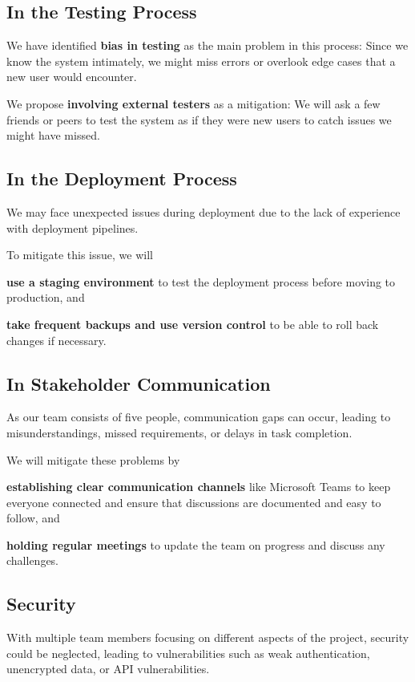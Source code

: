 \documentclass[a4paper,journal]{IEEEtran}
\begin{document}
\subsection{In the Testing Process}
We have identified \textbf{bias in testing} as the main problem in this
process:
Since we know the system intimately, we might miss errors or overlook edge cases
that a new user would encounter.

We propose \textbf{involving external testers} as a mitigation:
We will ask a few friends or peers to test the system as if they were new users
to catch issues we might have missed.

\subsection{In the Deployment Process}
We may face unexpected issues during deployment due to the lack of experience
with deployment pipelines.

To mitigate this issue, we will
\begin{enumerate*}
  \item \textbf{use a staging environment} to test the deployment process before
    moving to production, and
  \item \textbf{take frequent backups and use version control} to be able to
    roll back changes if necessary.
\end{enumerate*}

\subsection{In Stakeholder Communication}
As our team consists of five people, communication gaps can occur, leading to
misunderstandings, missed requirements, or delays in task completion.

We will mitigate these problems by
\begin{enumerate*}
  \item \textbf{establishing clear communication channels}
    like Microsoft Teams to keep everyone connected and ensure that discussions
    are documented and easy to follow, and
  \item \textbf{holding regular meetings}
    to update the team on progress and discuss any challenges.
\end{enumerate*}

\subsection{Security}
With multiple team members focusing on different aspects of the project,
security could be neglected, leading to vulnerabilities such as weak
authentication, unencrypted data, or API vulnerabilities.
\end{document}
